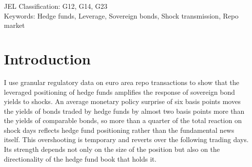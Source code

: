 \documentclass[english, 11pt, oneside]{article}
\begin{document}
\begin{titlepage}
\begin{center}
\vspace{1.5cm}

\begin{singlespace}


\begin{abstract}
\begin{hyphenrules}{nohyphenation}
\noindent 

\noindent This paper presents evidence that the leveraged positioning of hedge funds amplifies the response of sovereign bond yields to shocks, leading to temporary overshooting. Combining granular regulatory data on repo positions with high-frequency monetary policy surprises, I study this amplification at the individual bond level. Four results emerge. First, even among comparable bonds, hedge funds add excess volatility on shock days, because their positioning raises the sensitivity of yields to the surprise. Second, this additional sensitivity accounts for more than a quarter of the total yield movement these surprises generate and scales with position intensity. Third, the amplification operates symmetrically, whether a shock moves prices in favor of a position or against it, consistent with leveraged investors rebalancing toward their desired exposure. Finally, it is concentrated among bonds held in directional books and essentially absent when the book offsets its long and short positions.

\end{hyphenrules}
\end{abstract}

\end{singlespace}
\end{center}



\vspace{1cm}

JEL Classification: G12, G14, G23 \\
Keywords: Hedge funds, Leverage, Sovereign bonds, Shock transmission, Repo market\\

\normalsize

\end{titlepage}

\setlength{\baselineskip}{0.75cm}



\newpage 
\section{Introduction}
I use granular regulatory data on euro area repo transactions to show that the leveraged positioning of hedge funds amplifies the response of sovereign bond yields to shocks. An average monetary policy surprise of six basis points moves the yields of bonds traded by hedge funds by almost two basis points more than the yields of comparable bonds, so more than a quarter of the total reaction on shock days reflects hedge fund positioning rather than the fundamental news itself. This overshooting is temporary and reverts over the following trading days. Its strength depends not only on the size of the position but also on the directionality of the hedge fund book that holds it.
\end{document}
